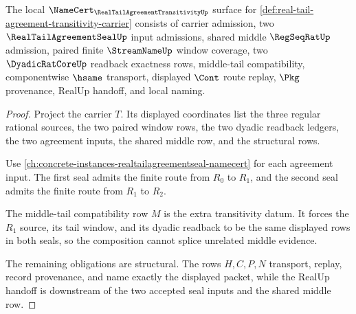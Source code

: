 \begin{theorem}
\label{thm:real-tail-agreement-transitivity-namecert-obligations}
The local $\NameCert_{\RealTailAgreementTransitivityUp}$ surface for \autoref{def:real-tail-agreement-transitivity-carrier} consists of carrier admission, two $\RealTailAgreementSealUp$ input admissions, shared middle $\RegSeqRatUp$ admission, paired finite $\StreamNameUp$ window coverage, two $\DyadicRatCoreUp$ readback exactness rows, middle-tail compatibility, componentwise $\hsame$ transport, displayed $\Cont$ route replay, $\Pkg$ provenance, RealUp handoff, and local naming.
\end{theorem}
\begin{proof}
Project the carrier $T$. Its displayed coordinates list the three regular rational sources, the two paired window rows, the two dyadic readback ledgers, the two agreement inputs, the shared middle row, and the structural rows.

Use \autoref{ch:concrete-instances-realtailagreementseal-namecert} for each agreement input. The first seal admits the finite route from $R_0$ to $R_1$, and the second seal admits the finite route from $R_1$ to $R_2$.

The middle-tail compatibility row $M$ is the extra transitivity datum. It forces the $R_1$ source, its tail window, and its dyadic readback to be the same displayed rows in both seals, so the composition cannot splice unrelated middle evidence.

The remaining obligations are structural. The rows $H,C,P,N$ transport, replay, record provenance, and name exactly the displayed packet, while the RealUp handoff is downstream of the two accepted seal inputs and the shared middle row.
\end{proof}

